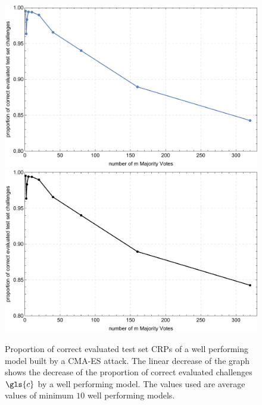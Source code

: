 \vspace{0.25cm}
\begin{figure}[ht]
\ifx{}\undefined
{}
\else
	\if{}
	\centering
	\includegraphics[width=1.00\textwidth]{images/single-mv-classification-cma-attack-correctness.pdf}
	\else
	\includegraphics[width=1.00\textwidth]{images/single-mv-classification-cma-attack-correctness_mono.pdf}
	\fi
\fi
\caption[Proportion of correct evaluated test set challenges for Arbiter \puf models and Majority Arbiter \puf models]{Proportion of correct evaluated test set \acp{CRP} of a well performing model built by a \ac{CMA-ES} attack. The linear decrease of the graph shows the decrease of the proportion of correct evaluated challenges $\gls{c}$ by a well performing model. The values used are average values of minimum $10$ well performing models.}
\label{fig:cmasingleattackcorrectness}
\end{figure}

